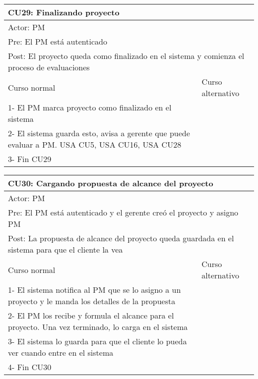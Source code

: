 \begin{table}[H]
  \begin{adjustbox}{max width = \textwidth}
  \begin{tabular}{|l|l|}
    \hline
    \multicolumn{2}{|l|}{CU29: Finalizando proyecto} \\\hline
    \multicolumn{2}{|l|}{Actor: PM} \\\hline
    \multicolumn{2}{|l|}{Pre: El PM está autenticado} \\\hline
    \multicolumn{2}{|l|}{Post: El proyecto queda como finalizado en el sistema y comienza el proceso de evaluaciones} \\\hline
     Curso normal & Curso alternativo\\ \hline
	 1- El PM marca proyecto como finalizado en el sistema & \\ \hline
	 2- El sistema guarda esto, avisa a gerente que puede evaluar a PM. USA CU5, USA CU16, USA CU28 & \\ \hline
   3- Fin CU29 & \\ \hline
  \end{tabular}
  \end{adjustbox}
\end{table}

\begin{table}[H]
  \begin{adjustbox}{max width = \textwidth}
  \begin{tabular}{|l|l|}
    \hline
    \multicolumn{2}{|l|}{CU30: Cargando propuesta de alcance del proyecto} \\\hline
    \multicolumn{2}{|l|}{Actor: PM} \\\hline
    \multicolumn{2}{|l|}{Pre: El PM está autenticado y el gerente creó el proyecto y asigno PM} \\\hline
    \multicolumn{2}{|l|}{Post: La propuesta de alcance del proyecto queda guardada en el sistema para que el cliente la vea} \\\hline
     Curso normal & Curso alternativo\\ \hline
	 1- El sistema notifica al PM que se lo asigno a un proyecto y le manda los detalles de la propuesta & \\ \hline
	 2- El PM los recibe y formula el alcance para el proyecto. Una vez terminado, lo carga en el sistema& \\ \hline
   3- El sistema lo guarda para que el cliente lo pueda ver cuando entre en el sistema & \\ \hline
   4- Fin CU30 & \\ \hline
  \end{tabular}
  \end{adjustbox}
\end{table}

